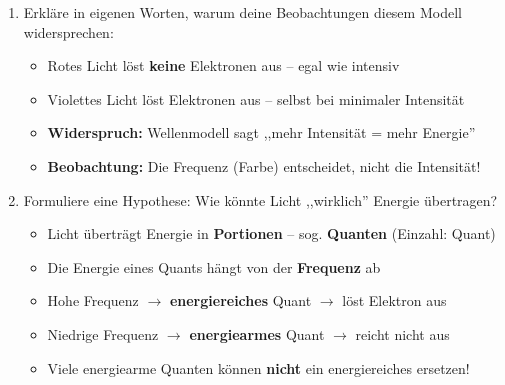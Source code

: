 \documentclass[11pt,a4paper]{article}
\begin{document}
\begin{enumerate}[label=\alph*)]
\item Erkläre in eigenen Worten, warum deine Beobachtungen diesem Modell widersprechen:

\begin{tcolorbox}[leerbox=3.5cm]
\textcolor{loesung}{\begin{itemize}[nosep,leftmargin=*]
\item Rotes Licht löst \textbf{keine} Elektronen aus -- egal wie intensiv
\item Violettes Licht löst Elektronen aus -- selbst bei minimaler Intensität
\item \textbf{Widerspruch:} Wellenmodell sagt ,,mehr Intensität = mehr Energie''
\item \textbf{Beobachtung:} Die Frequenz (Farbe) entscheidet, nicht die Intensität!
\end{itemize}}
\end{tcolorbox}

\item Formuliere eine Hypothese: Wie könnte Licht ,,wirklich'' Energie übertragen?

\begin{tcolorbox}[leerbox=3.5cm]
\textcolor{loesung}{\begin{itemize}[nosep,leftmargin=*]
\item Licht überträgt Energie in \textbf{Portionen} -- sog. \textbf{Quanten} (Einzahl: Quant)
\item Die Energie eines Quants hängt von der \textbf{Frequenz} ab
\item Hohe Frequenz $\rightarrow$ \textbf{energiereiches} Quant $\rightarrow$ löst Elektron aus
\item Niedrige Frequenz $\rightarrow$ \textbf{energiearmes} Quant $\rightarrow$ reicht nicht aus
\item Viele energiearme Quanten können \textbf{nicht} ein energiereiches ersetzen!
\end{itemize}}
\end{tcolorbox}
\end{enumerate}

\vspace{0.5em}

\end{document}
